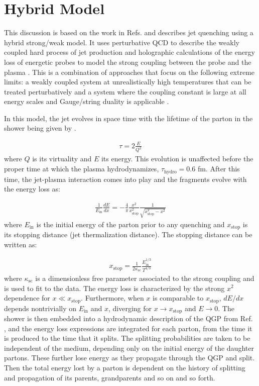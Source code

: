 \section{Hybrid Model}
This discussion is based on the work in Refs. \cite{Casalderrey-Solana:2014bpa, Hulcher:2017cpt, Casalderrey-Solana:2016jvj} and describes jet quenching using a hybrid strong/weak model. It uses perturbative QCD to describe the weakly coupled hard process of jet production and holographic calculations of the energy loss of energetic probes to model the strong coupling between the probe and the plasma \cite{Chesler:2015nqz, Chesler:2014jva}. This is a combination of approaches that focus on the following extreme limits: a weakly coupled system at unrealistically high temperatures that can be treated perturbatively \cite{Jacobs:2004qv, Majumder:2010qh} and a system where the coupling constant is large at all energy scales and Gauge/string duality is applicable \cite{CasalderreySolana:2011us}.

In this model, the jet evolves in space time with the lifetime of the parton in the shower being given by \cite{CasalderreySolana:2011gx}.  

\begin{align}
\tau = 2 \frac{E}{Q^2}
\end{align}
where $Q$ is its virtuality and $E$ its energy. This evolution is unaffected before the proper time at which the plasma hydrodynamizes, $\tau_{\text{hydro}} = 0.6$ fm. After this time, the jet-plasma interaction comes into play and the fragments evolve with the energy loss as:

\begin{align}
\frac{1}{E_{\mathrm{in}}} \frac{dE}{dx} = -\frac{4}{\pi} \frac{x^2}{x_{\mathrm{stop}}^2} \frac{1}{\sqrt{x_{\mathrm{stop}}^2 - x^2}}
\end{align}
where $E_{\mathrm{in}}$ is the initial energy of the parton prior to any quenching and $x_{\mathrm{stop}}$ is its stopping distance (jet thermalization distance). The stopping distance can be written as:

\begin{align}
x_\mathrm{stop} = \frac{1}{2\kappa_\mathrm{sc}} \frac{E_\mathrm{in}^{1/3}}{T^{4/3}}
\end{align}
where $\kappa_\mathrm{sc}$ is a dimensionless free parameter associated to the strong coupling and is used to fit to the data. The energy loss is characterized by the strong  $x^2$ dependence for $x \ll x_\mathrm{stop}$. Furthermore, when $x$ is comparable to $x_\mathrm{stop}$, $dE/dx$ depends nontrivially on $E_\mathrm{in}$ and $x$, diverging for $x\rightarrow x_\mathrm{stop}$ and $E\rightarrow0$. The shower is then embedded into a hydrodynamic description of the QGP from Ref. \cite{Hirano:2010je}, and the energy loss expressions are integrated for each parton, from the time it is produced to the time that it splits. The splitting probabilities are taken to be independent of the medium, depending only on the initial energy of the daughter partons. These further lose energy as they propagate through the QGP and split. Then the total energy lost by a parton is dependent on the history of splitting and propagation of its parents, grandparents and so on and so forth. 

